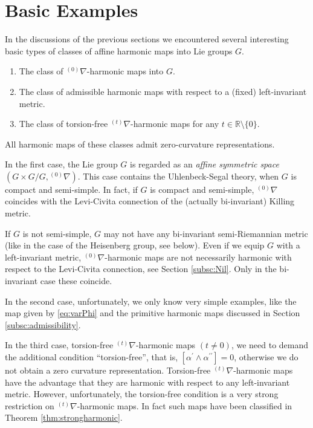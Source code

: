 \documentclass[12pt]{amsart}
\theoremstyle{definition}
\theoremstyle{remark}
\numberwithin{equation}{section}
\begin{document}
\section{Basic Examples}\label{sc:BasicExamples}
 In the discussions of the previous sections we encountered several 
 interesting basic types of 
 classes of affine harmonic maps into  Lie groups $G$. 
\begin{enumerate}
 \item The class of ${{}^{(0)}\nabla}$-harmonic maps into $G$.

\item The class of admissible harmonic maps with respect to a (fixed)
 left-invariant metric.

\item The class of torsion-free ${{}^{(t)} \nabla}$-harmonic maps for any  
      $t \in \mathbb R \setminus \{0\}$.
\end{enumerate}
 All harmonic maps of these classes admit zero-curvature representations.

 In the first case, the Lie group $G$ is regarded 
 as an \textit{affine symmetric space} 
 $(G\times{G}/G,{{}^{(0)}\nabla})$. This case contains the Uhlenbeck-Segal theory, 
 when $G$ is compact and semi-simple. In fact, if $G$ is compact and 
 semi-simple, 
 ${{}^{(0)}\nabla}$ coincides with the Levi-Civita connection of 
 the (actually bi-invariant) Killing metric. 

 If  $G$ is not semi-simple, $G$ may not have any  bi-invariant 
 semi-Riemannian metric (like in the case of the Heisenberg group, see below).
 Even if we equip $G$ with a left-invariant metric, ${{}^{(0)}\nabla}$-harmonic 
 maps are 
 not necessarily harmonic with respect to the Levi-Civita connection, see Section \ref{subsc:Nil}.
 Only in the bi-invariant case these coincide.

 In the second case, unfortunately, we 
 only know very simple examples, like 
 the map given by \eqref{eq:varPhi} 
 and the primitive harmonic maps discussed in 
 Section \ref{subsc:admissibility}.
 
 In the third case, torsion-free ${{}^{(t)} \nabla}$-harmonic maps $(t \neq 0)$, 
 we need to demand the additional condition ``torsion-free'', 
 that is, $[\alpha^\prime\wedge \alpha^{\prime\prime}]=0$, 
 otherwise we do not  obtain a zero curvature representation.
 Torsion-free ${{}^{(t)} \nabla}$-harmonic maps have the advantage that 
 they are harmonic with respect to any left-invariant metric.
 However, unfortunately, the torsion-free condition is a very 
 strong restriction on ${{}^{(t)} \nabla}$-harmonic maps. In fact such maps 
 have been classified in Theorem \ref{thm:strongharmonic}.
\end{document}
